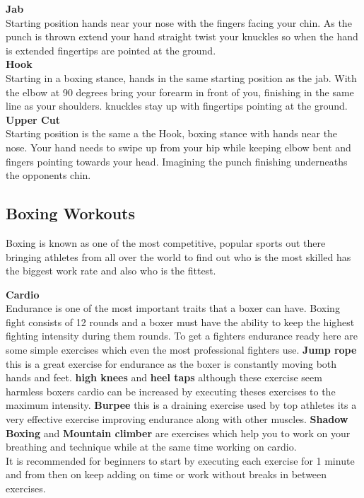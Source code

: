 \documentclass[a4paper,12pt,twoside]{report}
\begin{document}
\textbf{Jab}\\
Starting position hands near your nose with the fingers facing your chin.
As the punch is thrown extend your hand straight twist your knuckles so when the hand is extended fingertips are pointed at the ground.\\
\textbf{Hook}\\
Starting in a boxing stance, hands in the same starting position as the jab.
With the elbow at 90 degrees bring your forearm in front of you, finishing in the same line as your shoulders. 
knuckles stay up with fingertips pointing at the ground.\\
\textbf{Upper Cut}\\
Starting position is the same a the Hook, boxing stance with hands near the nose. 
Your hand needs to swipe up from your hip while keeping elbow bent and fingers pointing towards your head. Imagining the punch finishing underneaths the opponents chin.\cite{punchingPhysics}

\newpage
\subsection{Boxing Workouts}
Boxing is known as one of the most competitive, popular sports out there bringing athletes from all over the world to find out who is the most skilled has the biggest work rate and also who is the fittest.

\textbf{Cardio}\\
Endurance is one of the most important traits that a boxer can have. Boxing fight consists of 12 rounds and a boxer must have the ability to keep the highest fighting intensity during them rounds.
To get  a fighters endurance ready here are some simple exercises which even the most professional fighters use.
\textbf{Jump rope} this is a great exercise for endurance as the boxer is constantly moving both hands and feet. \textbf{high knees} and \textbf{heel taps} although these exercise seem harmless boxers cardio can be increased by executing theses exercises to the maximum intensity. \textbf{Burpee} this is a draining exercise used by top athletes its a very effective exercise improving endurance along with other muscles. \textbf{Shadow Boxing} and \textbf{Mountain climber} are exercises which help you to work on your breathing and technique while at the same time working on cardio.\\
It is recommended for beginners to start by executing each exercise for 1 minute and from then on keep adding on time or work without breaks in between exercises. \cite{cardioWorkout}
\end{document}
